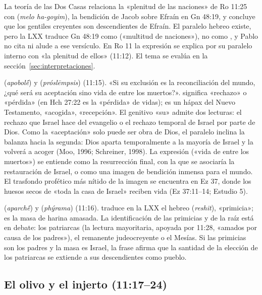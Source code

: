 \begin{nota}
La teoría de las Dos Casas relaciona la «plenitud de las naciones» de Ro 11:25 con  (\emph{melo ha-goyim}), la bendición de Jacob sobre Efraín en Gn 48:19, y concluye que los gentiles creyentes son descendientes de Efraín. El paralelo hebreo existe, pero la LXX traduce Gn 48:19 como  («multitud de naciones»), no como , y Pablo no cita ni alude a ese versículo. En Ro 11 la expresión se explica por su paralelo interno con «la plenitud de ellos» (11:12). El tema se evalúa en la sección~\ref{sec:interpretaciones}.
\end{nota}

\textbf{} (\emph{apobolḗ}) y \textbf{} (\emph{próslēmpsis}) (11:15). «Si su exclusión es la reconciliación del mundo, ¿qué será su aceptación sino vida de entre los muertos?».  significa «rechazo» o «pérdida» (en Hch 27:22 es la «pérdida» de vidas);  es un hápax del Nuevo Testamento, «acogida», «recepción». El genitivo «su» admite dos lecturas: el rechazo que Israel hace del evangelio o el rechazo temporal de Israel por parte de Dios. Como la «aceptación» solo puede ser obra de Dios, el paralelo inclina la balanza hacia la segunda: Dios aparta temporalmente a la mayoría de Israel y la volverá a acoger (Moo, 1996; Schreiner, 1998). La expresión  («vida de entre los muertos») se entiende como la resurrección final, con la que se asociaría la restauración de Israel, o como una imagen de bendición inmensa para el mundo. El trasfondo profético más nítido de la imagen se encuentra en Ez 37, donde los huesos secos de «toda la casa de Israel» reciben vida (Ez 37:11--14; Estudio 5).

\textbf{} (\emph{aparchḗ}) y \textbf{} (\emph{phýrama}) (11:16).  traduce en la LXX el hebreo  (\emph{reshit}), «primicia»;  es la masa de harina amasada. La identificación de las primicias y de la raíz está en debate: los patriarcas (la lectura mayoritaria, apoyada por 11:28, «amados por causa de los padres»), el remanente judeocreyente o el Mesías. Si las primicias son los padres y la masa es Israel, la frase afirma que la santidad de la elección de los patriarcas se extiende a sus descendientes como pueblo.

\subsection{El olivo y el injerto (11:17--24)}

